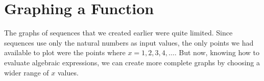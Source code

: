 
%
%
%


\section{Graphing a Function}
\label{sec:graphingfunc}

The graphs of sequences that we created earlier were quite limited. Since sequences use only the natural numbers as input values, the only points we had available to plot were the points where $x = 1, 2, 3, 4, \dotsc$. But now, knowing how to evaluate algebraic expressions, we can create more complete graphs by choosing a wider range of $x$ values.

